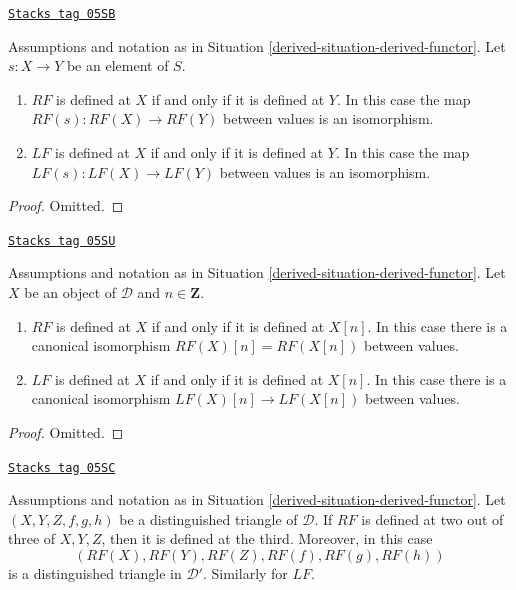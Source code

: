\begin{lemma}
\label{derived-lemma-derived-inverts}
\href{https://stacks.math.columbia.edu/tag/05SB}{\texttt{Stacks tag 05SB}}

Assumptions and notation as in
Situation \ref{derived-situation-derived-functor}.
Let $s : X \to Y$ be an element of $S$.
\begin{enumerate}
\item $RF$ is defined at $X$ if and only if it is defined at $Y$.
In this case the map $RF(s) : RF(X) \to RF(Y)$ between values
is an isomorphism.
\item $LF$ is defined at $X$ if and only if it is defined at $Y$.
In this case the map $LF(s) : LF(X) \to LF(Y)$ between values
is an isomorphism.
\end{enumerate}
\end{lemma}

\begin{proof}
Omitted.
\end{proof}

\begin{lemma}
\label{derived-lemma-derived-shift}
\href{https://stacks.math.columbia.edu/tag/05SU}{\texttt{Stacks tag 05SU}}


Assumptions and notation as in
Situation \ref{derived-situation-derived-functor}.
Let $X$ be an object of $\mathcal{D}$ and $n \in \mathbf{Z}$.
\begin{enumerate}
\item $RF$ is defined at $X$ if and only if it is defined at $X[n]$.
In this case there is a canonical isomorphism
$RF(X)[n]= RF(X[n])$ between values.
\item $LF$ is defined at $X$ if and only if it is defined at $X[n]$.
In this case there is a canonical isomorphism
$LF(X)[n] \to LF(X[n])$ between values.
\end{enumerate}
\end{lemma}

\begin{proof}
Omitted.
\end{proof}

\begin{lemma}
\label{derived-lemma-2-out-of-3-defined}
\href{https://stacks.math.columbia.edu/tag/05SC}{\texttt{Stacks tag 05SC}}

Assumptions and notation as in
Situation \ref{derived-situation-derived-functor}.
Let $(X, Y, Z, f, g, h)$ be a distinguished triangle of $\mathcal{D}$.
If $RF$ is defined at two out of three of $X, Y, Z$, then it is defined
at the third. Moreover, in this case
$$
(RF(X), RF(Y), RF(Z), RF(f), RF(g), RF(h))
$$
is a distinguished triangle in $\mathcal{D}'$. Similarly for $LF$.
\end{lemma}

